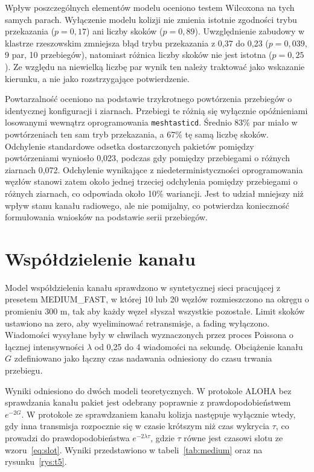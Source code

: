 Wpływ poszczególnych elementów modelu oceniono testem Wilcoxona na tych samych parach. Wyłączenie modelu kolizji nie zmienia istotnie zgodności trybu przekazania (\(p = 0{,}17\)) ani liczby skoków (\(p = 0{,}89\)). Uwzględnienie zabudowy w klastrze rzeszowskim zmniejsza błąd trybu przekazania z 0,37 do 0,23 (\(p = 0{,}039\), 9 par, 10 przebiegów), natomiast różnica liczby skoków nie jest istotna (\(p = 0{,}25\)). Ze względu na niewielką liczbę par wynik ten należy traktować jako wskazanie kierunku, a nie jako rozstrzygające potwierdzenie.

Powtarzalność oceniono na podstawie trzykrotnego powtórzenia przebiegów o identycznej konfiguracji i ziarnach. Przebiegi te różnią się wyłącznie opóźnieniami losowanymi wewnątrz oprogramowania \texttt{meshtasticd}. Średnio 83\% par miało w powtórzeniach ten sam tryb przekazania, a 67\% tę samą liczbę skoków. Odchylenie standardowe odsetka dostarczonych pakietów pomiędzy powtórzeniami wyniosło 0,023, podczas gdy pomiędzy przebiegami o różnych ziarnach 0,072. Odchylenie wynikające z niedeterministyczności oprogramowania węzłów stanowi zatem około jednej trzeciej odchylenia pomiędzy przebiegami o różnych ziarnach, co odpowiada około 10\% wariancji. Jest to udział mniejszy niż wpływ stanu kanału radiowego, ale nie pomijalny, co potwierdza konieczność formułowania wniosków na podstawie serii przebiegów.

\section{Współdzielenie kanału}

Model współdzielenia kanału sprawdzono w syntetycznej sieci pracującej z presetem MEDIUM\_FAST, w której 10 lub 20 węzłów rozmieszczono na okręgu o promieniu 300 m, tak aby każdy węzeł słyszał wszystkie pozostałe. Limit skoków ustawiono na zero, aby wyeliminować retransmisje, a fading wyłączono. Wiadomości wysyłane były w chwilach wyznaczonych przez proces Poissona o łącznej intensywności \(\lambda\) od 0,25 do 4 wiadomości na sekundę. Obciążenie kanału \(G\) zdefiniowano jako łączny czas nadawania odniesiony do czasu trwania przebiegu.

Wyniki odniesiono do dwóch modeli teoretycznych. W protokole ALOHA \cite{abramson1970} bez sprawdzania kanału pakiet jest odebrany poprawnie z prawdopodobieństwem \(e^{-2G}\). W protokole ze sprawdzaniem kanału \cite{kleinrock1975} kolizja następuje wyłącznie wtedy, gdy inna transmisja rozpocznie się w czasie krótszym niż czas wykrycia \(\tau\), co prowadzi do prawdopodobieństwa \(e^{-2\lambda\tau}\), gdzie \(\tau\) równe jest czasowi slotu ze wzoru~\eqref{eq:slot}. Wyniki przedstawiono w tabeli~\ref{tab:medium} oraz na rysunku~\ref{rys:t5}.


